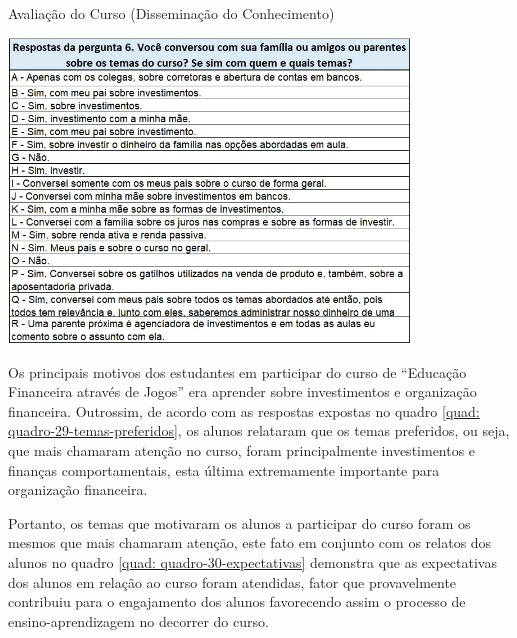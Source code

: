 \graphicspath{{quadros/}} 
\begin{quadro}[!ht]
\centering
\begin{minipage}{0.80\textwidth}
\caption{Avaliação do Curso (Disseminação do Conhecimento)}
\centering
\includegraphics[width=0.80\textwidth]{quadro-28-disseminação}
\label{quad: quadro-28-disseminação}
\end{minipage}
\end{quadro}

\newpage
Os principais motivos dos estudantes em participar do curso de “Educação Financeira através de Jogos” era aprender sobre investimentos e organização financeira. Outrossim, de acordo com as respostas expostas no quadro \ref{quad: quadro-29-temas-preferidos}, os alunos relataram que os temas preferidos, ou seja, que mais chamaram atenção no curso, foram principalmente investimentos e finanças comportamentais, esta última extremamente importante para organização financeira.

Portanto, os temas que motivaram os alunos a participar do curso foram os mesmos que mais chamaram atenção, este fato em conjunto com os relatos dos alunos no quadro \ref{quad: quadro-30-expectativas} demonstra que as expectativas dos alunos em relação ao curso foram atendidas, fator que provavelmente contribuiu para o engajamento dos alunos favorecendo assim o processo de ensino-aprendizagem no decorrer do curso.

